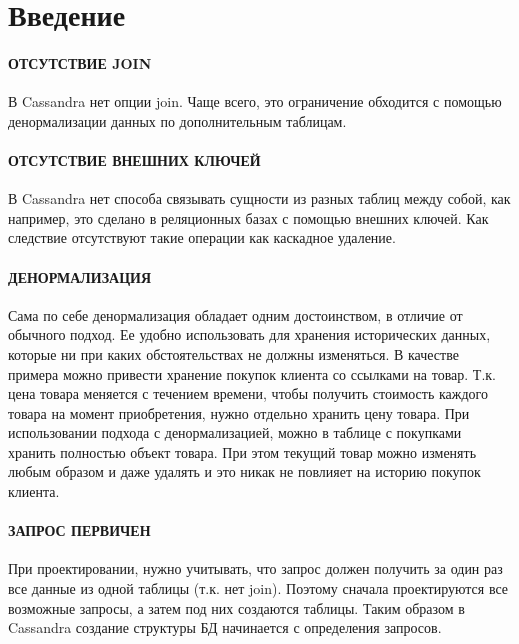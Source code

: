 \section*{\LARGE Введение}

\paragraph{ОТСУТСТВИЕ JOIN}

В Cassandra нет опции join. Чаще всего, это ограничение обходится с
помощью денормализации данных по дополнительным таблицам.

\paragraph{ОТСУТСТВИЕ ВНЕШНИХ КЛЮЧЕЙ}

В Cassandra нет способа связывать сущности из разных таблиц между
собой, как например, это сделано в реляционных базах с помощью внешних
ключей. Как следствие отсутствуют такие операции как каскадное удаление.

\paragraph{ДЕНОРМАЛИЗАЦИЯ}

Сама по себе денормализация обладает одним достоинством, в отличие от
обычного подход. Ее удобно использовать для хранения исторических данных,
которые ни при каких обстоятельствах не должны изменяться. В качестве
примера можно привести хранение покупок клиента со ссылками на товар. Т.к.
цена товара меняется с течением времени, чтобы получить стоимость каждого
товара на момент приобретения, нужно отдельно хранить цену товара. При
использовании подхода с денормализацией, можно в таблице с покупками
хранить полностью объект товара. При этом текущий товар можно изменять
любым образом и даже удалять и это никак не повлияет на историю покупок
клиента.

\paragraph{ЗАПРОС ПЕРВИЧЕН}

При проектировании, нужно учитывать, что запрос должен получить за
один раз все данные из одной таблицы (т.к. нет join). Поэтому сначала
проектируются все возможные запросы, а затем под них создаются таблицы.
Таким образом в Cassandra создание структуры БД начинается с определения
запросов.

